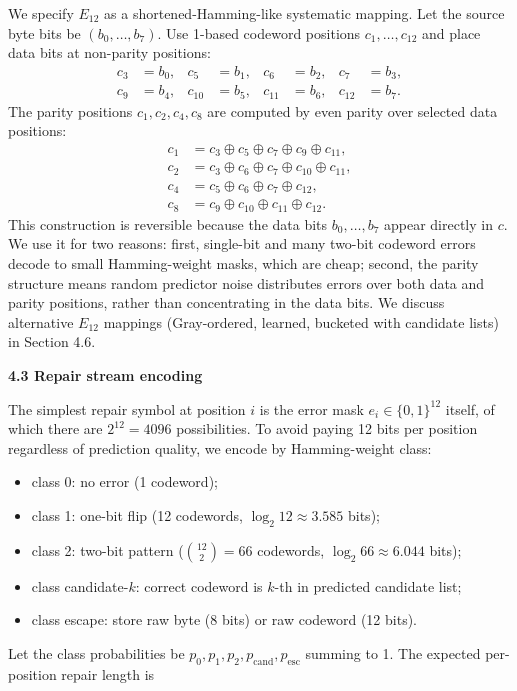 \documentclass[
]{article}
\begin{document}
We specify $E_{12}$ as a shortened-Hamming-like systematic mapping. Let
the source byte bits be $(b_0, \ldots, b_7)$. Use 1-based codeword
positions $c_1, \ldots, c_{12}$ and place data bits at non-parity
positions:
\[
\begin{aligned}
c_3 &= b_0, & c_5 &= b_1, & c_6 &= b_2, & c_7 &= b_3, \\
c_9 &= b_4, & c_{10} &= b_5, & c_{11} &= b_6, & c_{12} &= b_7.
\end{aligned}
\]
The parity positions $c_1, c_2, c_4, c_8$ are computed by even parity
over selected data positions:
\[
\begin{aligned}
c_1 &= c_3 \oplus c_5 \oplus c_7 \oplus c_9 \oplus c_{11}, \\
c_2 &= c_3 \oplus c_6 \oplus c_7 \oplus c_{10} \oplus c_{11}, \\
c_4 &= c_5 \oplus c_6 \oplus c_7 \oplus c_{12}, \\
c_8 &= c_9 \oplus c_{10} \oplus c_{11} \oplus c_{12}.
\end{aligned}
\]
This construction is reversible because the data bits $b_0, \ldots, b_7$
appear directly in $c$. We use it for two reasons: first, single-bit
and many two-bit codeword errors decode to small Hamming-weight masks,
which are cheap; second, the parity structure means random predictor
noise distributes errors over both data and parity positions, rather
than concentrating in the data bits. We discuss alternative $E_{12}$
mappings (Gray-ordered, learned, bucketed with candidate lists) in
Section 4.6.

\textbf{4.3 Repair stream encoding}

The simplest repair symbol at position $i$ is the error mask $e_i \in
\{0,1\}^{12}$ itself, of which there are $2^{12} = 4096$ possibilities.
To avoid paying 12 bits per position regardless of prediction quality,
we encode by Hamming-weight class:
\begin{itemize}
\item class 0: no error (1 codeword);
\item class 1: one-bit flip (12 codewords, $\log_2 12 \approx 3.585$ bits);
\item class 2: two-bit pattern ($\binom{12}{2} = 66$ codewords, $\log_2 66 \approx 6.044$ bits);
\item class candidate-$k$: correct codeword is $k$-th in predicted candidate list;
\item class escape: store raw byte (8 bits) or raw codeword (12 bits).
\end{itemize}
Let the class probabilities be $p_0, p_1, p_2, p_{\text{cand}}, p_{\text{esc}}$
summing to 1. The expected per-position repair length is
\end{document}
